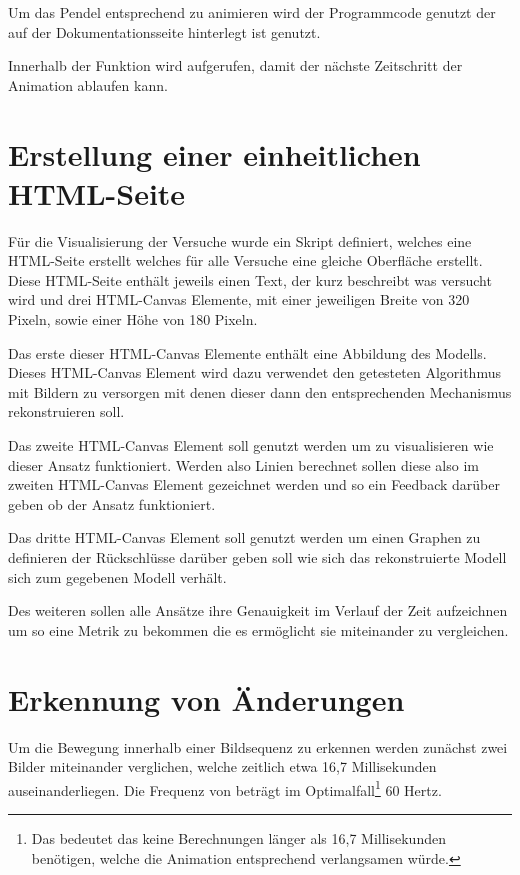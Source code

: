 Um das Pendel entsprechend zu animieren wird der Programmcode genutzt der auf der Dokumentationsseite  hinterlegt ist genutzt.

Innerhalb der  Funktion wird  aufgerufen, damit der nächste Zeitschritt der Animation ablaufen kann.

\section{Erstellung einer einheitlichen HTML-Seite}

Für die Visualisierung der Versuche wurde ein Skript definiert, welches eine HTML-Seite erstellt welches für alle Versuche eine gleiche Oberfläche erstellt.
Diese HTML-Seite enthält jeweils einen Text, der kurz beschreibt was versucht wird und drei HTML-Canvas Elemente, mit einer jeweiligen Breite von 320 Pixeln, sowie einer Höhe von 180 Pixeln.

Das erste dieser HTML-Canvas Elemente enthält eine Abbildung des  Modells.
Dieses HTML-Canvas Element wird dazu verwendet den getesteten Algorithmus mit Bildern zu versorgen mit denen dieser dann den entsprechenden Mechanismus rekonstruieren soll.

Das zweite HTML-Canvas Element soll genutzt werden um zu visualisieren wie dieser Ansatz funktioniert.
Werden also Linien berechnet sollen diese also im zweiten HTML-Canvas Element gezeichnet werden und so ein Feedback darüber geben ob der Ansatz funktioniert.


Das dritte HTML-Canvas Element soll genutzt werden um einen Graphen zu definieren der Rückschlüsse darüber geben soll wie sich das rekonstruierte Modell sich zum gegebenen Modell verhält.

Des weiteren sollen alle Ansätze ihre Genauigkeit im Verlauf der Zeit aufzeichnen um so eine Metrik zu bekommen die es ermöglicht sie miteinander zu vergleichen.

\section{Erkennung von Änderungen}\label{ch:erkennung_von_änderungen}

Um die Bewegung innerhalb einer Bildsequenz zu erkennen werden zunächst zwei Bilder miteinander verglichen, welche zeitlich etwa 16,7 Millisekunden auseinanderliegen.
Die Frequenz von  beträgt im Optimalfall\footnote{Das bedeutet das keine Berechnungen länger als 16,7 Millisekunden benötigen, welche die Animation entsprechend verlangsamen würde.} 60 Hertz.

